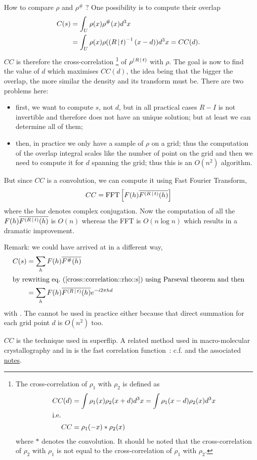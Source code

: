 \documentclass[11pt]{article}
\begin{document}
How to compare $\rho$ and $\rho^\#$ ? One possibility is to compute their overlap
\begin{align}
C(s) &= \int_U \rho(x) \rho^\#(x) d^3x  \label{cross::correlation::rho::s}\\
&= \int_U \rho(x) \rho(\left( R\,\vert\, t \right)^{-1}(x - d))d^3x = CC(d). \label{cross::correlation::rho::d}
\end{align}
$CC$ is therefore the cross-correlation%
\footnote{The cross-correlation of $\rho_1$ with $\rho_2$ is defined as
\begin{align}
CC(d) &= \int \rho_1(x) \rho_2(x+d)d^3x = \int \rho_1(x-d) \rho_2(x) d^3x \\
\intertext{i.e.}
CC &= \rho_1(-x) * \rho_2(x)
\end{align}
where $*$ denotes the convolution. It should be noted that the cross-correlation of $\rho_2$ with $\rho_1$ is not equal to the cross-correlation of $\rho_1$ with $\rho_2$.} 
of $\rho^{\left( R\,\vert\, t \right)}$ with $\rho$.
The goal is now to find the value of $d$ which maximises $CC(d)$, the idea being that the bigger the overlap, the more similar the density and its transform must be. There are two problems here:
\begin{itemize}
\item first, we want to compute $s$, not $d$, but in all practical cases $R-I$ is not invertible and therefore  does not have an unique solution; but at least we can determine all of them;
\item then, in practice we only have a sample of $\rho$ on a grid; thus the computation of the overlap integral scales like the number of point on the grid and then we need to compute it for $d$ spanning the grid; thus this is an $O(n^2)$ algorithm.
\end{itemize}
But since $CC$ is a convolution, we can compute it using Fast Fourier Transform,
\newcommand{\tmp}{F(h)\overline{F^{\sym{R}{t}}(h)}}
\begin{equation}
CC = \fourier{\tmp}\label{CC:as::FFT}
\end{equation}
where the bar denotes complex conjugation. Now the computation of all the $\tmp$ is $O(n)$ whereas the FFT is $O(n\log n)$ which results in a dramatic improvement.

Remark: we could have arrived at  in a different way,
\begin{align}
C(s) &= \sum_h F(h)\overline{F^\#(h)} \label{cross::correlation::F}\\
\intertext{by rewriting \refeq{cross::correlation::rho::s} using Parseval theorem and then}
&= \sum_h F(h) \overline{F^{\sym{R}{t}}(h)} e^{-i2\pi hd}
\end{align}
with . The  cannot be used in practice either because that direct summation for each grid point $d$ is $O(n^2)$ too.

$CC$ is the technique used in superflip. A related method used in macro-molecular crystallography and in  is the fast correlation function~\cite{J.Navaza:1995}: c.f.  and the associated \href{file://../translation_search/notes.pdf}{notes}.


\end{document}
